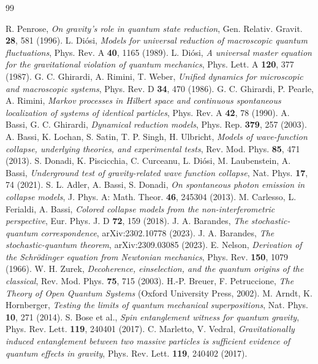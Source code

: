 \documentclass[aps,prd,onecolumn,amsmath,amssymb,nofootinbib,superscriptaddress]{revtex4-2}
\begin{document}
\begin{thebibliography}{99}

 R. Penrose, \emph{On gravity's role in quantum state reduction}, Gen. Relativ. Gravit. \textbf{28}, 581 (1996).
 L. Di\'osi, \emph{Models for universal reduction of macroscopic quantum fluctuations}, Phys. Rev. A \textbf{40}, 1165 (1989).
 L. Di\'osi, \emph{A universal master equation for the gravitational violation of quantum mechanics}, Phys. Lett. A \textbf{120}, 377 (1987).
 G. C. Ghirardi, A. Rimini, T. Weber, \emph{Unified dynamics for microscopic and macroscopic systems}, Phys. Rev. D \textbf{34}, 470 (1986).
 G. C. Ghirardi, P. Pearle, A. Rimini, \emph{Markov processes in Hilbert space and continuous spontaneous localization of systems of identical particles}, Phys. Rev. A \textbf{42}, 78 (1990).
 A. Bassi, G. C. Ghirardi, \emph{Dynamical reduction models}, Phys. Rep. \textbf{379}, 257 (2003).
 A. Bassi, K. Lochan, S. Satin, T. P. Singh, H. Ulbricht, \emph{Models of wave-function collapse, underlying theories, and experimental tests}, Rev. Mod. Phys. \textbf{85}, 471 (2013).
 S. Donadi, K. Piscicchia, C. Curceanu, L. Di\'osi, M. Laubenstein, A. Bassi, \emph{Underground test of gravity-related wave function collapse}, Nat. Phys. \textbf{17}, 74 (2021).
 S. L. Adler, A. Bassi, S. Donadi, \emph{On spontaneous photon emission in collapse models}, J. Phys. A: Math. Theor. \textbf{46}, 245304 (2013).
 M. Carlesso, L. Ferialdi, A. Bassi, \emph{Colored collapse models from the non-interferometric perspective}, Eur. Phys. J. D \textbf{72}, 159 (2018).
 J. A. Barandes, \emph{The stochastic-quantum correspondence}, arXiv:2302.10778 (2023).
 J. A. Barandes, \emph{The stochastic-quantum theorem}, arXiv:2309.03085 (2023).
 E. Nelson, \emph{Derivation of the Schr\"odinger equation from Newtonian mechanics}, Phys. Rev. \textbf{150}, 1079 (1966).
 W. H. Zurek, \emph{Decoherence, einselection, and the quantum origins of the classical}, Rev. Mod. Phys. \textbf{75}, 715 (2003).
 H.-P. Breuer, F. Petruccione, \emph{The Theory of Open Quantum Systems} (Oxford University Press, 2002).
 M. Arndt, K. Hornberger, \emph{Testing the limits of quantum mechanical superpositions}, Nat. Phys. \textbf{10}, 271 (2014).
 S. Bose et al., \emph{Spin entanglement witness for quantum gravity}, Phys. Rev. Lett. \textbf{119}, 240401 (2017).
 C. Marletto, V. Vedral, \emph{Gravitationally induced entanglement between two massive particles is sufficient evidence of quantum effects in gravity}, Phys. Rev. Lett. \textbf{119}, 240402 (2017).

\end{thebibliography}
\end{document}
